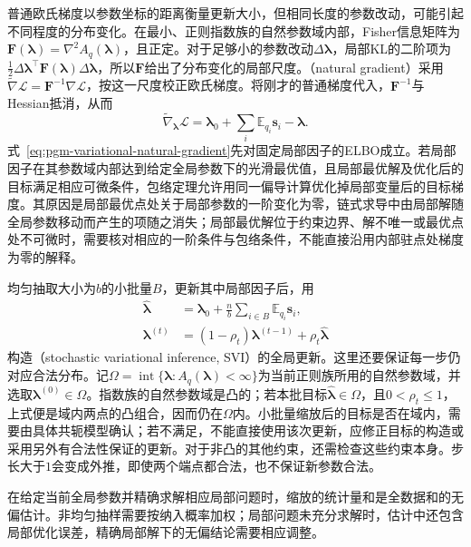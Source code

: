 普通欧氏梯度以参数坐标的距离衡量更新大小，但相同长度的参数改动，可能引起不同程度的分布变化。在最小、正则指数族的自然参数域内部，Fisher信息矩阵为$\bm F(\bm\lambda)=\nabla^2 A_q(\bm\lambda)$，且正定。对于足够小的参数改动$\Delta\bm\lambda$，局部KL的二阶项为$\tfrac12\Delta\bm\lambda^\top\bm F(\bm\lambda)\Delta\bm\lambda$，所以$\bm F$给出了分布变化的局部尺度。（natural gradient）采用$\widetilde\nabla\mathcal L=\bm F^{-1}\nabla\mathcal L$，按这一尺度校正欧氏梯度。将刚才的普通梯度代入，$\bm F^{-1}$与Hessian抵消，从而
\begin{equation}
  \widetilde\nabla_{\bm{\lambda}}\mathcal L
    =\bm{\lambda}_0+\sum_i\mathbb E_{q_i}\bm s_i-\bm{\lambda}.
  \label{eq:pgm-variational-natural-gradient}
\end{equation}
式~\eqref{eq:pgm-variational-natural-gradient}先对固定局部因子的ELBO成立。若局部因子在其参数域内部达到给定全局参数下的光滑最优值，且局部最优解及优化后的目标满足相应可微条件，包络定理允许用同一偏导计算优化掉局部变量后的目标梯度。其原因是局部最优点处关于局部参数的一阶变化为零，链式求导中由局部解随全局参数移动而产生的项随之消失；局部最优解位于约束边界、解不唯一或最优点处不可微时，需要核对相应的一阶条件与包络条件，不能直接沿用内部驻点处梯度为零的解释。

均匀抽取大小为$b$的小批量$B$，更新其中局部因子后，用
\begin{equation}
  \begin{aligned}
    \widehat{\bm{\lambda}}
      &=\bm{\lambda}_0+\frac{n}{b}
           \sum_{i\in B}\mathbb E_{q_i}\bm s_i,\\
    \bm{\lambda}^{(t)}
      &=(1-\rho_t)\bm{\lambda}^{(t-1)}
          +\rho_t\widehat{\bm{\lambda}}
  \end{aligned}
  \label{eq:pgm-variational-svi}
\end{equation}
构造（stochastic variational inference, SVI）的全局更新。这里还要保证每一步仍对应合法分布。记$\Omega=\operatorname{int}\{\bm\lambda:A_q(\bm\lambda)<\infty\}$为当前正则族所用的自然参数域，并选取$\bm\lambda^{(0)}\in\Omega$。指数族的自然参数域是凸的；若本批目标$\widehat{\bm\lambda}\in\Omega$，且$0<\rho_t\leq1$，上式便是域内两点的凸组合，因而仍在$\Omega$内。小批量缩放后的目标是否在域内，需要由具体共轭模型确认；若不满足，不能直接使用该次更新，应修正目标的构造或采用另外有合法性保证的更新。对于非凸的其他约束，还需检查这些约束本身。步长大于$1$会变成外推，即使两个端点都合法，也不保证新参数合法。

在给定当前全局参数并精确求解相应局部问题时，缩放的统计量和是全数据和的无偏估计。非均匀抽样需要按纳入概率加权；局部问题未充分求解时，估计中还包含局部优化误差，精确局部解下的无偏结论需要相应调整。


